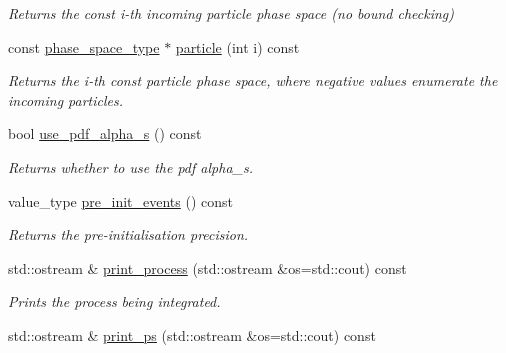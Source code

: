 \begin{DoxyCompactItemize}
\begin{DoxyCompactList}\small\item\em Returns the const i-\/th incoming particle phase space (no bound checking) \end{DoxyCompactList}\item 
const \hyperlink{a00400}{phase\-\_\-space\-\_\-type} $\ast$ \hyperlink{a00430_a505447e7e96d765e69d9e622439bbc52}{particle} (int i) const 
\begin{DoxyCompactList}\small\item\em Returns the i-\/th const particle phase space, where negative values enumerate the incoming particles. \end{DoxyCompactList}\item 
\hypertarget{a00430_a91b7ae85d57c380f1508a16a5cde31b6}{bool \hyperlink{a00430_a91b7ae85d57c380f1508a16a5cde31b6}{use\-\_\-pdf\-\_\-alpha\-\_\-s} () const }\label{a00430_a91b7ae85d57c380f1508a16a5cde31b6}

\begin{DoxyCompactList}\small\item\em Returns whether to use the pdf alpha\-\_\-s. \end{DoxyCompactList}\item 
\hypertarget{a00430_a6c4f0ad8650bce3fcb71edaf36e9d641}{value\-\_\-type \hyperlink{a00430_a6c4f0ad8650bce3fcb71edaf36e9d641}{pre\-\_\-init\-\_\-events} () const }\label{a00430_a6c4f0ad8650bce3fcb71edaf36e9d641}

\begin{DoxyCompactList}\small\item\em Returns the pre-\/initialisation precision. \end{DoxyCompactList}\item 
\hypertarget{a00430_aa4098eeba2b0f5b50d53b3dfac9eb0a0}{std\-::ostream \& \hyperlink{a00430_aa4098eeba2b0f5b50d53b3dfac9eb0a0}{print\-\_\-process} (std\-::ostream \&os=std\-::cout) const }\label{a00430_aa4098eeba2b0f5b50d53b3dfac9eb0a0}

\begin{DoxyCompactList}\small\item\em Prints the process being integrated. \end{DoxyCompactList}\item 
\hypertarget{a00430_a7d1941d4bacdacd4ee642919a8cf12d9}{std\-::ostream \& \hyperlink{a00430_a7d1941d4bacdacd4ee642919a8cf12d9}{print\-\_\-ps} (std\-::ostream \&os=std\-::cout) const }\label{a00430_a7d1941d4bacdacd4ee642919a8cf12d9}


\end{DoxyCompactItemize}
